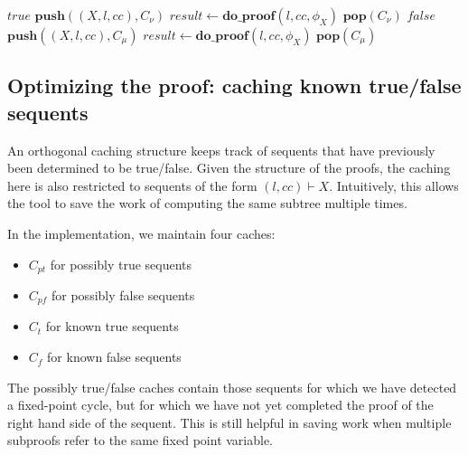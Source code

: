 \documentclass{article}
\newcommand{\loc}{l}
\newcommand{\region}{\mathit{cc}}
\newcommand{\var}[1]{\ensuremath{\mathit{#1}}}
\newcommand{\method}[1]{\ensuremath{\mathbf{#1}}}
\begin{document}
\begin{algorithm}[H]
  \caption{$\method{do\_proof\_predicate}(\loc, \region, \phi)$}
  \begin{algorithmic}
  \STATE {}
  \STATE {}
  
    \IF{$\exists (X, \loc, \region') \in C_\nu . \region \subseteq \region'$}
      \RETURN $\mathit{true}$
    \ELSE
      \STATE $\method{push}((X, \loc, \region), C_\nu)$
      \STATE $\var{result} \gets \method{do\_proof}(\loc, \region, \phi_X)$
      \STATE $\method{pop}(C_\nu)$
    \ENDIF
  \ELSE[Parity of $X$ is $\mu$]
    \IF{$\exists (X, \loc, \region') \in C_\mu . \region' \subseteq \region$}
      \RETURN $\mathit{false}$
    \ELSE
      \STATE $\method{push}((X, \loc, \region), C_\mu)$
      \STATE $\var{result} \gets \method{do\_proof}(\loc, \region, \phi_X)$
      \STATE $\method{pop}(C_\mu)$
    \ENDIF
  \ENDIF
\end{algorithmic}
\end{algorithm}

\subsection{Optimizing the proof: caching known true/false sequents}
An orthogonal caching structure keeps track of sequents that have previously been determined to be true/false. Given the structure of the proofs, the caching here is also restricted to sequents of the form $(\loc, \region) \vdash X$. Intuitively, this allows the tool to save the work of computing the same subtree multiple times.

In the implementation, we maintain four caches:
\begin{itemize}
  \item $C_{pt}$ for possibly true sequents
  \item $C_{pf}$ for possibly false sequents
  \item $C_{t}$ for known true sequents
  \item $C_{f}$ for known false sequents
\end{itemize}
The possibly true/false caches contain those sequents for which we have detected a fixed-point cycle, but for which we have not yet completed the proof of the right hand side of the sequent. This is still helpful in saving work when multiple subproofs refer to the same fixed point variable.
\end{document}
